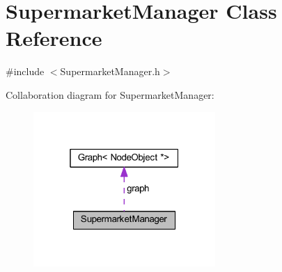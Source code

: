 \hypertarget{class_supermarket_manager}{}\section{Supermarket\+Manager Class Reference}
\label{class_supermarket_manager}


{\ttfamily \#include $<$Supermarket\+Manager.\+h$>$}



Collaboration diagram for Supermarket\+Manager\+:
\nopagebreak
\begin{figure}[H]
\begin{center}
\leavevmode
\includegraphics[width=196pt]{class_supermarket_manager__coll__graph}
\end{center}
\end{figure}
